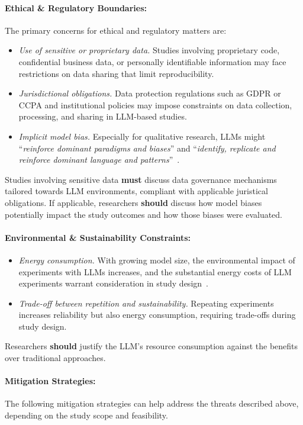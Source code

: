 \documentclass[smallextended]{svjour3}
\newcommand*{\enq}[1]{\enquote{{\itshape#1}}}
\newcommand{\must}{\textbf{must}\xspace}
\newcommand{\should}{\textbf{should}\xspace}
\begin{document}
\paragraph{Ethical \& Regulatory Boundaries:}
The primary concerns for ethical and regulatory matters are:
\begin{itemize}
    \item \emph{Use of sensitive or proprietary data.} Studies involving proprietary code, confidential business data, or personally identifiable information may face restrictions on data sharing that limit reproducibility.
    \item \emph{Jurisdictional obligations.} Data protection regulations such as GDPR or CCPA and institutional policies may impose constraints on data collection, processing, and sharing in LLM-based studies.
    \item \emph{Implicit model bias.} Especially for qualitative research, LLMs might \enq{reinforce dominant paradigms and biases} and \enq{identify, replicate and reinforce dominant language and patterns}~\cite{jowsey2025reject}.
\end{itemize}

Studies involving sensitive data \must discuss data governance mechanisms tailored towards LLM environments, compliant with applicable juristical obligations. If applicable, researchers \should discuss how model biases potentially impact the study outcomes and how those biases were evaluated.

\paragraph{Environmental \& Sustainability Constraints:}
\begin{itemize}
    \item \emph{Energy consumption.} With growing model size, the environmental impact of experiments with LLMs increases, and the substantial energy costs of LLM experiments warrant consideration in study design~\cite{DBLP:conf/acl/StrubellGM19}.
    \item \emph{Trade-off between repetition and sustainability.} Repeating experiments increases reliability but also energy consumption, requiring trade-offs during study design.
\end{itemize}

Researchers \should justify the LLM's resource consumption against the benefits over traditional approaches.

\paragraph{Mitigation Strategies:}
The following mitigation strategies can help address the threats described above, depending on the study scope and feasibility.
\end{document}
